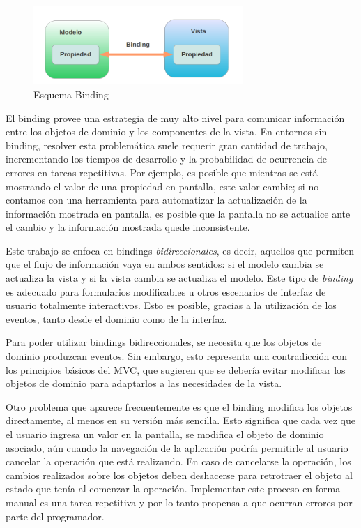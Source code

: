 		\begin{figure}[h]
			\centering
			\includegraphics[width=300px]{img/binding}
			\caption{Esquema Binding}
			\label{fig:binding}
		\end{figure}
		
		\bigskip
	
	El binding provee una estrategia de muy alto nivel para comunicar información entre
	los objetos de dominio y los componentes de la vista.
	En entornos sin binding, resolver esta problemática suele requerir gran
	cantidad de trabajo, incrementando los tiempos de desarrollo y la probabilidad
	de ocurrencia de errores en tareas repetitivas.
	Por ejemplo, es posible que mientras se está mostrando el valor de una
	propiedad en pantalla, este valor cambie; si no contamos con una herramienta
	para automatizar la actualización de la información mostrada en
	pantalla, es posible que la pantalla no se actualice ante el cambio
	y la información mostrada quede inconsistente.

	\medskip

	Este trabajo se enfoca en bindings \emph{bidireccionales}, es decir, aquellos
	que permiten que el flujo de información vaya en ambos sentidos: si el
	modelo cambia se actualiza la vista y si la vista cambia se actualiza el
	modelo.
	Este tipo de \emph{binding} es adecuado para formularios modificables u otros
	escenarios de interfaz de usuario totalmente interactivos.
	Esto es posible, gracias a la utilización de los eventos, tanto desde el
	dominio como de la interfaz.
	
% 	
	Para poder utilizar bindings bidireccionales, se necesita que los objetos de
	dominio produzcan eventos. Sin embargo, esto representa una contradicción con
	los principios básicos del MVC, que sugieren que se debería evitar modificar
	los objetos de dominio para adaptarlos a las necesidades de la vista.
	
	Otro problema que aparece frecuentemente es que el binding modifica los objetos
	directamente, al menos en su versión más sencilla. 
	Esto significa que cada vez que el usuario ingresa un valor en la pantalla,
	se modifica el objeto de dominio asociado, aún cuando la navegación de la aplicación podría
	permitirle al usuario cancelar la operación que está realizando.
	En caso de cancelarse la operación, los cambios realizados sobre los objetos
	deben deshacerse para retrotraer el objeto al estado que tenía al comenzar la
	operación. Implementar este proceso en forma manual es una tarea repetitiva y
	por lo tanto propensa a que ocurran errores por parte del programador.
	
